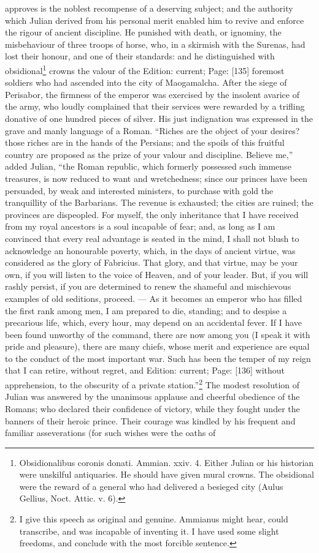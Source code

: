 approves is the noblest recompense of a deserving subject; and the authority which Julian derived from his personal merit enabled him to revive and enforce the rigour of ancient discipline. He punished with death, or ignominy, the misbehaviour of three troops of horse, who, in a skirmish with the Surenas, had lost their honour, and one of their standards: and he distinguished with obsidional\footnote{Obsidionalibus coronis donati. Ammian. xxiv. 4. Either Julian or his historian were unskilful antiquaries. He should have given mural crowns. The obsidional were the reward of a general who had delivered a besieged city (Aulus Gellius, Noct. Attic. v. 6).} crowns the valour of the Edition: current; Page: [135] foremost soldiers who had ascended into the city of Maogamalcha. After the siege of Perisabor, the firmness of the emperor was exercised by the insolent avarice of the army, who loudly complained that their services were rewarded by a trifling donative of one hundred pieces of silver. His just indignation was expressed in the grave and manly language of a Roman. \texthebrew{“}Riches are the object of your desires? those riches are in the hands of the Persians; and the spoils of this fruitful country are proposed as the prize of your valour and discipline. Believe me,\texthebrew{}” added Julian, \texthebrew{“}the Roman republic, which formerly possessed such immense treasures, is now reduced to want and wretchedness; since our princes have been persuaded, by weak and interested ministers, to purchase with gold the tranquillity of the Barbarians. The revenue is exhausted; the cities are ruined; the provinces are dispeopled. For myself, the only inheritance that I have received from my royal ancestors is a soul incapable of fear; and, as long as I am convinced that every real advantage is seated in the mind, I shall not blush to acknowledge an honourable poverty, which, in the days of ancient virtue, was considered as the glory of Fabricius. That glory, and that virtue, may be your own, if you will listen to the voice of Heaven, and of your leader. But, if you will rashly persist, if you are determined to renew the shameful and mischievous examples of old seditions, proceed. \texthebrew{—} As it becomes an emperor who has filled the first rank among men, I am prepared to die, standing; and to despise a precarious life, which, every hour, may depend on an accidental fever. If I have been found unworthy of the command, there are now among you (I speak it with pride and pleasure), there are many chiefs, whose merit and experience are equal to the conduct of the most important war. Such has been the temper of my reign that I can retire, without regret, and Edition: current; Page: [136] without apprehension, to the obscurity of a private station.\texthebrew{}”\footnote{I give this speech as original and genuine. Ammianus might hear, could transcribe, and was incapable of inventing it. I have used some slight freedoms, and conclude with the most forcible sentence.} The modest resolution of Julian was answered by the unanimous applause and cheerful obedience of the Romans; who declared their confidence of victory, while they fought under the banners of their heroic prince. Their courage was kindled by his frequent and familiar asseverations (for such wishes were the oaths of 